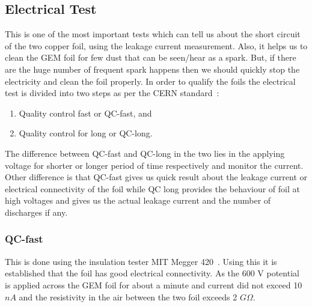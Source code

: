\subsection{Electrical Test} %
\label{sub:electrical_test}
This is one of the most important tests which can tell us about the short circuit of the two copper foil, using the leakage current measurement.
Also, it helps us to clean the GEM foil for few dust that can be seen/hear as a spark.
But, if there are the huge number of frequent spark happens then we should quickly stop the electricity and clean the foil properly. In order to qualify the foils the electrical test is divided into two steps as per the CERN standard~\cite{Abbaneo2015}:
\begin{enumerate}
    \item Quality control fast or QC-fast, and
    \item Quality control for long or QC-long.
\end{enumerate}
The difference between QC-fast and QC-long in the two lies in the applying voltage for shorter or longer period of time respectively and monitor the current. Other difference is that QC-fast gives us quick result about the leakage current or electrical connectivity of the foil while QC long provides the behaviour of foil at high voltages and gives us the actual leakage current and the number of discharges if any.
\subsubsection{QC-fast} %
\label{ssub:qc_fast}
This is done using the insulation tester MIT Megger 420~\cite{twelve}. Using this it is established that the foil has good electrical connectivity. As the 600 V potential is applied across the GEM foil for about a minute and current did not exceed 10 $nA$ and the resistivity in the air between the two foil exceeds 2 $G\Omega$.

